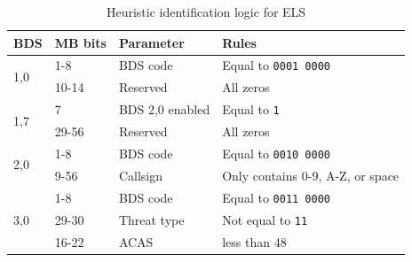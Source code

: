 \begin{table}
\centering
\small
\caption{Heuristic identification logic for ELS}
\label{tb:bds_rule_els}
\begin{tabular}{|l|l|l|l|}
\hline
\textbf{BDS} & \textbf{MB bits} & \textbf{Parameter} & \textbf{Rules} \\ \hline \hline
\multirow{2}{*}{1,0} & 1-8 & BDS code & Equal to \texttt{0001 0000}  \\ \cline{2-4} 
 & 10-14 & Reserved & All zeros \\ \hline \hline
\multirow{2}{*}{1,7} & 7 & BDS 2,0 enabled & Equal to \texttt{1} \\ \cline{2-4} 
 & 29-56 & Reserved & All zeros \\ \hline \hline
\multirow{2}{*}{2,0} & 1-8 & BDS code & Equal to \texttt{0010 0000} \\ \cline{2-4} 
 & 9-56 & Callsign & Only contains 0-9, A-Z, or space \\ \hline \hline
\multirow{3}{*}{3,0} & 1-8 & BDS code & Equal to \texttt{0011 0000} \\ \cline{2-4} 
 & 29-30 & Threat type & Not equal to \texttt{11} \\ \cline{2-4} 
 & 16-22 & ACAS &  less than 48 \\ \hline

\end{tabular}
\end{table}



